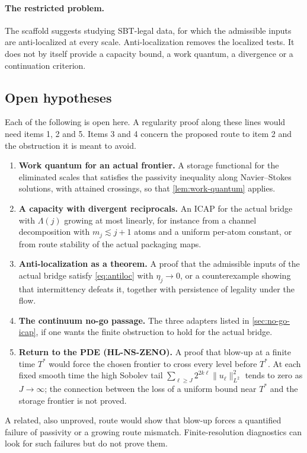 \paragraph{The restricted problem.}
The scaffold suggests studying SBT-legal data, for which the admissible inputs are anti-localized
at every scale. Anti-localization removes the localized tests. It does not by itself provide a
capacity bound, a work quantum, a divergence or a continuation criterion.

\subsection{Open hypotheses}
Each of the following is open here. A regularity proof along these lines would need items 1, 2
and 5. Items 3 and 4 concern the proposed route to item 2 and the obstruction it is meant to avoid.
\begin{enumerate}
\item \textbf{Work quantum for an actual frontier.} A storage functional for the eliminated scales
that satisfies the passivity inequality along Navier--Stokes solutions, with attained crossings, so
that \cref{lem:work-quantum} applies.
\item \textbf{A capacity with divergent reciprocals.} An ICAP for the actual bridge with
$\Lambda(j)$ growing at most linearly, for instance from a channel decomposition with $m_j\lesssim j+1$
atoms and a uniform per-atom constant, or from route stability of the actual packaging maps.
\item \textbf{Anti-localization as a theorem.} A proof that the admissible inputs of the actual
bridge satisfy \eqref{eq:antiloc} with $\eta_j\to0$, or a counterexample showing that intermittency
defeats it, together with persistence of legality under the flow.
\item \textbf{The continuum no-go passage.} The three adapters listed in \cref{sec:no-go-icap}, if
one wants the finite obstruction to hold for the actual bridge.
\item \textbf{Return to the PDE (HL-NS-ZENO).} A proof that blow-up at a finite time $T^\ast$ would
force the chosen frontier to cross every level before $T^\ast$. At each fixed smooth time the high
Sobolev tail $\sum_{\ell\ge J}2^{2k\ell}\|u_\ell\|_{L^2}^2$ tends to zero as $J\to\infty$; the
connection between the loss of a uniform bound near $T^\ast$ and the storage frontier is not proved.
\end{enumerate}
A related, also unproved, route would show that blow-up forces a quantified failure of passivity or
a growing route mismatch. Finite-resolution diagnostics can look for such failures but do not
prove them.

